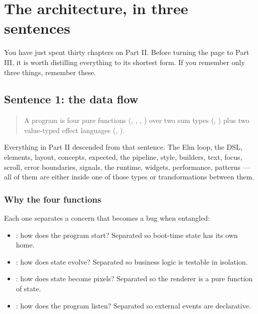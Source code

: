 \chapter{The architecture, in three sentences}
\label{ch:summary}

\begin{aside}
You have just spent thirty chapters on Part II. Before turning
the page to Part III, it is worth distilling everything to its
shortest form. If you remember only three things, remember
these.
\end{aside}

\section{Sentence 1: the data flow}

\begin{quote}
A \maya{} program is four pure functions
(, , , ) over
two sum types (, ) plus two value-typed
effect languages (, ).
\end{quote}

Everything in Part II descended from that sentence. The Elm
loop, the DSL, elements, layout, concepts, expected, the
pipeline, style, builders, text, focus, scroll, error
boundaries, signals, the runtime, widgets, performance,
patterns --- all of them are either inside one of those types
or transformations between them.

\subsection*{Why the four functions}

Each one separates a concern that becomes a bug when entangled:

\begin{itemize}[leftmargin=*]
  \item {}: how does the program start? Separated so
    boot-time state has its own home.
  \item {}: how does state evolve? Separated so
    business logic is testable in isolation.
  \item {}: how does state become pixels? Separated so
    the renderer is a pure function of state.
  \item {}: how does the program listen?
    Separated so external events are declarative.
\end{itemize}

